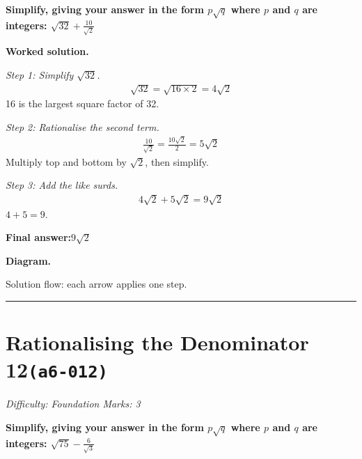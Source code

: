 \documentclass[11pt]{article}
\newcommand{\question}[1]{\par\medskip\noindent\textbf{#1}\par}
\begin{document}
\question{Simplify, giving your answer in the form \( p\sqrt{q} \) where \( p \) and \( q \) are integers: \( \sqrt{32} + \frac{10}{\sqrt{2}} \)}

\textbf{Worked solution.}

\textit{Step 1: Simplify \( \sqrt{32} \).}
\[\begin{gathered}
\sqrt{32} = \sqrt{16 \times 2} = 4\sqrt{2}
\end{gathered}\]
16 is the largest square factor of 32.

\textit{Step 2: Rationalise the second term.}
\[\begin{gathered}
\frac{10}{\sqrt{2}} = \frac{10\sqrt{2}}{2} = 5\sqrt{2}
\end{gathered}\]
Multiply top and bottom by \( \sqrt{2} \), then simplify.

\textit{Step 3: Add the like surds.}
\[\begin{gathered}
4\sqrt{2} + 5\sqrt{2} = 9\sqrt{2}
\end{gathered}\]
\( 4 + 5 = 9 \).

\begin{answerbox}
\textbf{Final answer:}\quad \(\displaystyle 9\sqrt{2}\)
\end{answerbox}
\textbf{Diagram.}

\begin{center}
\end{center}
\small Solution flow: each arrow applies one step.\normalsize

\medskip\hrule

\section*{Rationalising the Denominator 12\quad\small\texttt{(a6-012)}}
\textit{Difficulty: Foundation \quad\textbar\quad Marks: 3}

\question{Simplify, giving your answer in the form \( p\sqrt{q} \) where \( p \) and \( q \) are integers: \( \sqrt{75} - \frac{6}{\sqrt{3}} \)}
\end{document}
